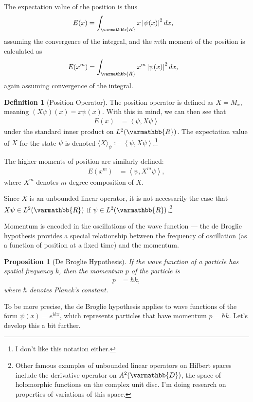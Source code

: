 \documentclass[12pt]{extarticle}
\newcommand{\R}{\varmathbb{R}}
\newcommand{\iprod}[2]{\left\langle #1,#2\right\rangle}
\theoremstyle{plain}
\newtheorem*{proposition}{Proposition}%
\theoremstyle{definition}
\newtheorem*{definition}{Definition}
\theoremstyle{remark}
\renewcommand{\newline}{\hfill\break}
\begin{document}
  The expectation value of the position is thus
  \begin{align*}
    E(x) &= \int_{\R}x\left\vert \psi(x) \right\vert^2dx,
  \end{align*}
  assuming the convergence of the integral, and the $m$th moment of the position is calculated as
  \begin{align*}
    E(x^m) &= \int_{\R}x^m\left\vert \psi(x) \right\vert^2dx,
  \end{align*}
  again assuming convergence of the integral.
  \begin{definition}[Position Operator]
    The position operator is defined as $X = M_{x}$, meaning $(X\psi)(x) = x\psi(x)$. With this in mind, we can then see that
    \begin{align*}
      E(x) &= \iprod{\psi}{X\psi}
    \end{align*}
    under the standard inner product on $L^{2}(\R)$. The expectation value of $X$ for the state $\psi$ is denoted $\langle X \rangle_{\psi} := \iprod{\psi}{X\psi}$.\footnote{I don't like this notation either.}\newline

    The higher moments of position are similarly defined:
    \begin{align*}
      E(x^m) &= \iprod{\psi}{X^{m}\psi},
    \end{align*}
    where $X^{m}$ denotes $m$-degree composition of $X$.\newline

    Since $X$ is an unbounded linear operator, it is not necessarily the case that $X\psi \in L^{2}(\R)$ if $\psi\in L^{2}(\R)$.\footnote{Other famous examples of unbounded linear operators on Hilbert spaces include the derivative operator on $A^{2}(\varmathbb{D})$, the space of holomorphic functions on the complex unit disc. I'm doing research on properties of variations of this space.}
  \end{definition}
  Momentum is encoded in the oscillations of the wave function --- the de Broglie hypothesis provides a special relationship between the frequency of oscillation (as a function of position at a fixed time) and the momentum.
  \begin{proposition}[De Broglie Hypothesis]
    If the wave function of a particle has spatial frequency $k$, then the momentum $p$ of the particle is
    \begin{align*}
      p &= \hbar k,
    \end{align*}
    where $\hbar$ denotes Planck's constant.
  \end{proposition}
  To be more precise, the de Broglie hypothesis applies to wave functions of the form $\psi(x) = e^{ikx}$, which represents particles that have momentum $p = \hbar k$. Let's develop this a bit further.\newline
\end{document}
